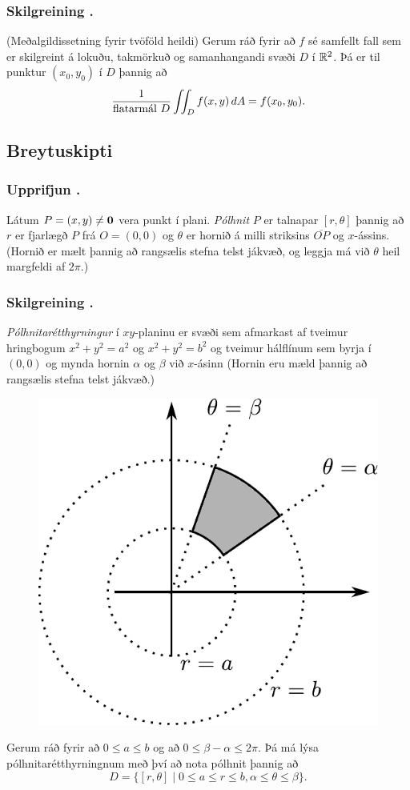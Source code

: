 \subsubsection{Skilgreining \kaflanr.}
(Meðalgildissetning fyrir tvöföld heildi)
Gerum ráð fyrir að $f$ sé samfellt fall sem er skilgreint á lokuðu, takmörkuð og samanhangandi svæði $D$ í ${\mathbb R}^2$.   Þá er til punktur $(x_0,y_0)$ í $D$ þannig að 
$$\frac{1}{\mbox{flatarmál }D}\int\!\!\!\int_D f(x,y)\,dA=f(x_0,y_0).$$




\subsection{Breytuskipti} 

\subsubsection{Upprifjun \kaflanr.}
 Látum $P=(x,y)\neq \mbox{${\bf 0}$}$ vera punkt í plani.  {\em
  Pólhnit} $P$ er talnapar $[r,\theta]$ þannig að $r$ er fjarlægð $P$
frá 
$O=(0,0)$ og $\theta$ er hornið á milli striksins $\overline{OP}$ og
  $x$-ássins.  (Hornið er mælt þannig að rangsælis stefna telst
  jákvæð, og leggja má við $\theta$ heil margfeldi af $2\pi$.) 



\subsubsection{Skilgreining \kaflanr.}
 {\em Pólhnitarétthyrningur} í $xy$-planinu
er svæði sem afmarkast af tveimur hringbogum $x^2+y^2=a^2$ og
$x^2+y^2=b^2$ og tveimur hálflínum sem byrja í $(0,0)$ og mynda hornin
$\alpha$ og $\beta$ við $x$-ásinn (Hornin eru mæld þannig að rangsælis
stefna telst jákvæð.) 
\begin {figure}[h!]
 \centering
            \includegraphics[width=0.35\linewidth]{polarrett}
\end {figure}
Gerum ráð fyrir að $0\leq a\leq b$ og að $0\leq\beta-\alpha\leq
2\pi$.  Þá má lýsa pólhnitarétthyrningnum með því  að nota pólhnit
þannig að 
$$D=\{[r,\theta]\mid 0\leq a\leq r\leq b, \alpha\leq \theta\leq\beta\}.$$
 



